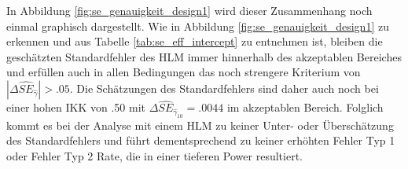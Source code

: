 \documentclass[12pt]{article}\usepackage[]{graphicx}\usepackage[]{color}
\begin{document}
In Abbildung \ref{fig:se_genauigkeit_design1} wird dieser Zusammenhang noch einmal graphisch dargestellt. Wie in Abbildung \ref{fig:se_genauigkeit_design1} zu erkennen und aus Tabelle \ref{tab:se_eff_intercept} zu entnehmen ist, bleiben die geschätzten Standardfehler des HLM immer hinnerhalb des akzeptablen Bereiches und erfüllen auch in allen Bedingungen das noch strengere Kriterium von $|\Delta\widehat{SE}_{\widehat{\gamma}}| > .05$. Die Schätzungen des Standardfehlers sind daher auch noch bei einer hohen IKK von .50 mit $\Delta\widehat{SE}_{\widehat{\gamma}_{10}} = .0044$ im akzeptablen Bereich. Folglich kommt es bei der Analyse mit einem HLM zu keiner Unter- oder Überschätzung des Standardfehlers und führt dementsprechend zu keiner erhöhten Fehler Typ 1 oder Fehler Typ 2 Rate, die in einer tieferen Power resultiert.
\end{document}
